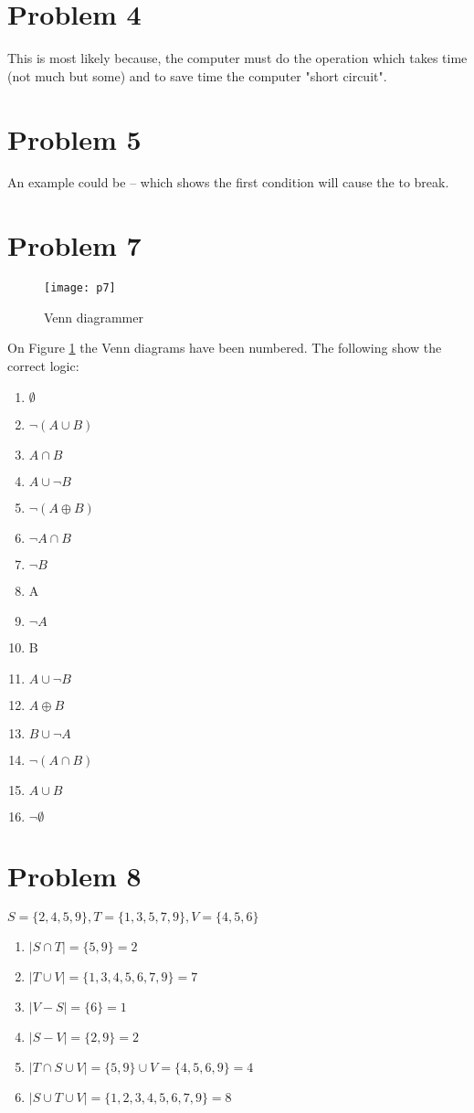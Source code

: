 \documentclass[english,10pt,a4paper]{article}
\begin{document}
\section*{Problem 4}
This is most likely because, the computer must do the operation which takes time (not much but some) and to save time the computer "short circuit".


\section*{Problem 5}
An example could be  -- which shows the first condition will cause the  to break.



\newpage
\section*{Problem 7}
\begin{figure}[hbtp]
\centering
\texttt{[image: p7]}
\caption{Venn diagrammer}
\label{fig:venn}
\end{figure}
On Figure \ref{fig:venn} the Venn diagrams have been numbered.
The following show the correct logic:
\begin{enumerate}
\item $\emptyset$
\item $\neg (A \cup B)$
\item $A \cap B$
\item $A \cup \neg B$
\item $\neg(A \oplus B)$
\item $\neg A \cap B$
\item $\neg B$
\item A
\item $\neg A$
\item B
\item $A \cup \neg B$
\item $A \oplus B$
\item $B \cup \neg A$
\item $\neg(A\cap B)$
\item $A\cup B $
\item $\neg \emptyset$
\end{enumerate}


\newpage
\section*{Problem 8}
$S=\{2, 4, 5, 9\}, T=\{1,3,5,7,9\}, V=\{4, 5, 6\}$
\begin{enumerate}[a]
\item $|S\cap T| = \{5, 9\} =2$
\item $|T\cup V| = \{1, 3, 4, 5 ,6, 7, 9\} =7$
\item $|V-S| = \{6\} = 1$
\item $|S-V| = \{2, 9\} = 2$
\item $|T\cap S \cup V| = \{5,9\} \cup V = \{4, 5, 6, 9\} = 4$
\item $|S \cup T \cup V| = \{1,2,3,4,5,6,7,9\} = 8$
\end{enumerate}
\end{document}
